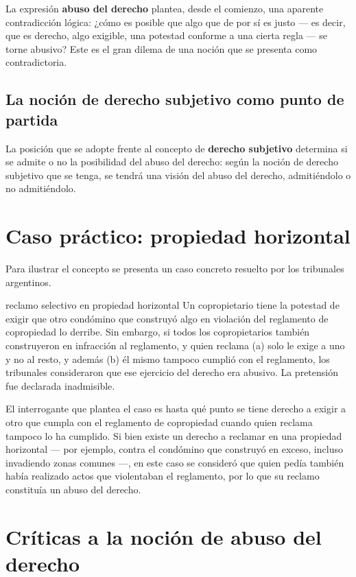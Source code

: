 \documentclass[12pt,oneside]{book}
\begin{document}
La expresión \textbf{abuso del derecho} plantea, desde el comienzo, una aparente contradicción lógica: ¿cómo es posible que algo que de por sí es justo --- es decir, que es derecho, algo exigible, una potestad conforme a una cierta regla --- se torne abusivo? Este es el gran dilema de una noción que se presenta como contradictoria.

\subsection{La noción de derecho subjetivo como punto de partida}

La posición que se adopte frente al concepto de \textbf{derecho subjetivo} determina si se admite o no la posibilidad del abuso del derecho: según la noción de derecho subjetivo que se tenga, se tendrá una visión del abuso del derecho, admitiéndolo o no admitiéndolo.

\section{Caso práctico: propiedad horizontal}

Para ilustrar el concepto se presenta un caso concreto resuelto por los tribunales argentinos.

\begin{example}{reclamo selectivo en propiedad horizontal}
Un copropietario tiene la potestad de exigir que otro condómino que construyó algo en violación del reglamento de copropiedad lo derribe. Sin embargo, si todos los copropietarios también construyeron en infracción al reglamento, y quien reclama (a) solo le exige a uno y no al resto, y además (b) él mismo tampoco cumplió con el reglamento, los tribunales consideraron que ese ejercicio del derecho era abusivo. La pretensión fue declarada inadmisible.
\end{example}

El interrogante que plantea el caso es hasta qué punto se tiene derecho a exigir a otro que cumpla con el reglamento de copropiedad cuando quien reclama tampoco lo ha cumplido. Si bien existe un derecho a reclamar en una propiedad horizontal --- por ejemplo, contra el condómino que construyó en exceso, incluso invadiendo zonas comunes ---, en este caso se consideró que quien pedía también había realizado actos que violentaban el reglamento, por lo que su reclamo constituía un abuso del derecho.

\section{Críticas a la noción de abuso del derecho}
\end{document}
